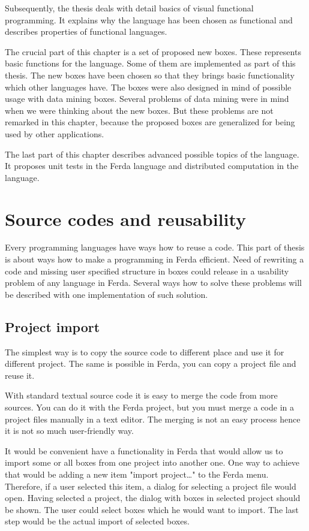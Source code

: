 \documentclass[a4paper,12pt]{book}
\begin{document}
Subsequently, the thesis deals with detail basics of visual functional programming. It explains why the language has been chosen as functional and describes properties of functional languages.

The crucial part of this chapter is a set of proposed new boxes. These represents basic functions for the language. Some of them are implemented as part of this thesis. The new boxes have been chosen so that they brings basic functionality which other languages have. The boxes were also designed in mind of possible usage with data mining boxes. Several problems of data mining were in mind when we were thinking about the new boxes. But these problems are not remarked in this chapter, because the proposed boxes are generalized for being used by other applications.

The last part of this chapter describes advanced possible topics of the language. It proposes unit tests in the Ferda language and distributed computation in the language.

\section{Source codes and reusability}
\label{sec:reusability}
Every programming languages have ways how to reuse a code. This part of thesis is about ways how to make a programming in Ferda efficient. Need of rewriting a code and missing user specified structure in boxes could release in a usability problem of any language in Ferda. Several ways how to solve these problems will be described with one implementation of such solution.

\subsection{Project import}
The simplest way is to copy the source code to different place and use it for different project. The same is possible in Ferda, you can copy a project file and reuse it.

With standard textual source code it is easy to merge the code from more sources. You can do it with the Ferda project, but you must merge a code in a project files manually in a text editor. The merging is not an easy process hence it is not so much user-friendly way.

It would be convenient have a functionality in Ferda that would allow us to import some or all boxes from one project into another one. One way to achieve that would be adding a new item "import project\dots" to the Ferda menu. Therefore, if a user selected this item, a dialog for selecting a project file would open. Having selected a project, the dialog with boxes in selected project should be shown. The user could select boxes which he would want to import. The last step would be the actual import of selected boxes.
\end{document}
